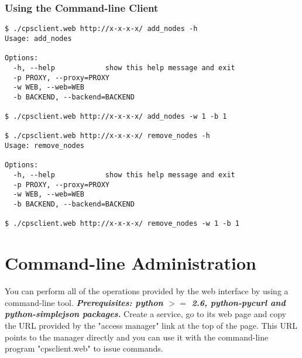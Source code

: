 \documentclass[10pt]{article}
\newenvironment{framedbox}[1]%
{\begin{framed}
 \begingroup
 \fontsize{#1}{#1}\selectfont
}
{
 \endgroup
 \end{framed}
}
\begin{document}
\subsubsection{Using the Command-line Client}
\begin{framedbox}{8pt}\begin{verbatim}
$ ./cpsclient.web http://x-x-x-x/ add_nodes -h
Usage: add_nodes

Options:
  -h, --help            show this help message and exit
  -p PROXY, --proxy=PROXY
  -w WEB, --web=WEB     
  -b BACKEND, --backend=BACKEND

$ ./cpsclient.web http://x-x-x-x/ add_nodes -w 1 -b 1

$ ./cpsclient.web http://x-x-x-x/ remove_nodes -h
Usage: remove_nodes

Options:
  -h, --help            show this help message and exit
  -p PROXY, --proxy=PROXY
  -w WEB, --web=WEB     
  -b BACKEND, --backend=BACKEND

$ ./cpsclient.web http://x-x-x-x/ remove_nodes -w 1 -b 1
\end{verbatim}\end{framedbox}

\section{Command-line Administration}
You can perform all of the operations provided by the web interface
by using a command-line tool. \textbf{\emph{Prerequisites: python $>=$ 2.6,
python-pycurl and python-simplejson packages.}}
Create a service, go to its web page and copy the URL provided by the 
"access manager" link at the top of the page. This URL points to the manager
directly and you can use it with the command-line program "cpsclient.web" to
issue commands.
\end{document}
